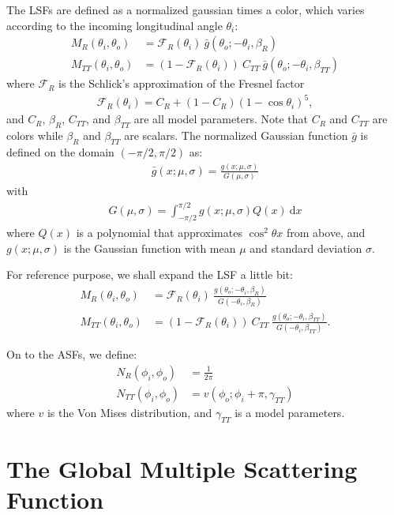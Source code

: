 \documentclass[10pt]{article}
\newcommand{\dee}{\mathrm{d}}
\begin{document}
  The LSFs are defined as a normalized gaussian times a color, which varies according to the incoming longitudinal angle $\theta_i$:
  \begin{align*}
  	M_R(\theta_i, \theta_o) &= \mathscr{F}_R(\theta_i)\ \bar{g}(\theta_o; -\theta_i, \beta_R) \\
  	M_{TT}(\theta_i, \theta_o) &= (1 - \mathscr{F}_R(\theta_i))\ C_{TT}\ \bar{g}(\theta_o; -\theta_i, \beta_{TT})
  \end{align*}
  where $\mathscr{F}_R$ is the Schlick's approximation of the Fresnel factor
  \begin{align*}
  	\mathscr{F}_R(\theta_i) = C_R + (1-C_R)(1 - \cos\theta_i)^5,
  \end{align*}
  and $C_R$, $\beta_R$, $C_{TT}$, and $\beta_{TT}$ are all model parameters.  Note that $C_R$ and $C_{TT}$ are colors while $\beta_R$ and $\beta_{TT}$ are scalars.  The normalized Gaussian function $\bar{g}$ is defined on the domain $(-\pi/2,\pi/2)$ as:
  \begin{align*}
  	\bar{g}(x; \mu, \sigma) = \frac{g(x; \mu, \sigma)}{G(\mu,\sigma)}
  \end{align*}
  with
  \begin{align*}
  	G(\mu,\sigma) = \int_{-\pi/2}^{\pi/2} g(x; \mu, \sigma) Q(x)\ \dee x
  \end{align*}
  where $Q(x)$ is a polynomial that approximates $\cos^2 \theta x$ from above, and $g(x;\mu,\sigma)$ is the Gaussian function with mean $\mu$ and standard deviation $\sigma$.

  For reference purpose, we shall expand the LSF a little bit:
  \begin{align*}
  	M_R(\theta_i, \theta_o) &= \mathscr{F}_R(\theta_i)\ \frac{g(\theta_o; -\theta_i, \beta_R)}{G(-\theta_i, \beta_R)} \\
  	M_{TT}(\theta_i, \theta_o) &= (1 - \mathscr{F}_R(\theta_i))\ C_{TT}\ \frac{g(\theta_o; -\theta_i, \beta_{TT})}{G(-\theta_i, \beta_{TT})}.
  \end{align*}

  On to the ASFs, we define:
  \begin{align*}
  	N_R(\phi_i, \phi_o) &= \frac{1}{2\pi} \\
  	N_{TT}(\phi_i, \phi_o) &= v(\phi_o; \phi_i + \pi, \gamma_{TT})
  \end{align*}
  where $v$ is the Von Mises distribution, and $\gamma_{TT}$ is a model parameters.

  \section{The Global Multiple Scattering Function}
\end{document}
